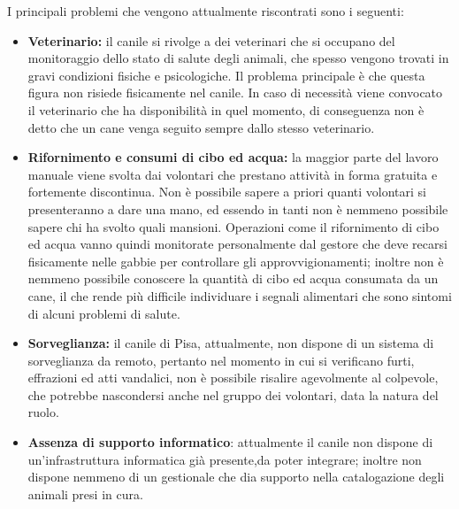 I principali problemi che vengono attualmente riscontrati sono i seguenti:
\begin{itemize}
    \item \textbf{Veterinario:} il canile si rivolge a dei veterinari che si occupano del monitoraggio dello stato di salute degli animali, che spesso vengono trovati in gravi condizioni fisiche e psicologiche. Il problema principale è che questa figura non risiede fisicamente nel canile. In caso di necessità viene convocato il veterinario che ha disponibilità in quel momento, di conseguenza non è detto che un cane venga seguito sempre dallo stesso veterinario. 
    \item \textbf{Rifornimento e consumi di cibo ed acqua:} la maggior parte del lavoro manuale viene svolta dai volontari che prestano attività in forma gratuita e fortemente discontinua. Non è possibile sapere a priori quanti volontari si presenteranno a dare una mano, ed essendo in tanti non è nemmeno possibile sapere chi ha svolto quali mansioni. Operazioni come il rifornimento di cibo ed acqua vanno quindi monitorate personalmente dal gestore che deve recarsi fisicamente nelle gabbie per controllare gli approvvigionamenti; inoltre non è nemmeno possibile conoscere la quantità di cibo ed acqua consumata da un cane, il che rende più difficile individuare i segnali alimentari che sono sintomi di alcuni problemi di salute.
    \item \textbf{Sorveglianza:} il canile di Pisa, attualmente, non dispone di un sistema di sorveglianza da remoto, pertanto nel momento in cui si verificano furti, effrazioni ed atti vandalici, non è possibile risalire agevolmente al colpevole, che potrebbe nascondersi anche nel gruppo dei volontari, data la natura del ruolo.
    
    \item \textbf{Assenza di supporto informatico}: attualmente il canile non dispone di un'infrastruttura informatica già presente,da poter integrare; inoltre non dispone nemmeno di un gestionale che dia supporto nella catalogazione degli animali presi in cura.
\end{itemize}
 




